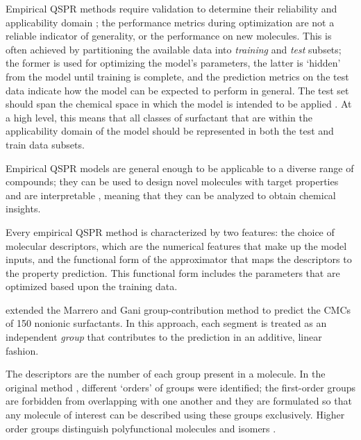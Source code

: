 Empirical QSPR methods require validation to determine their reliability and
applicability domain
\cite{veerasamyValidationQSARModelsstrategies2011,tropshaBestPracticesQSAR2010,leonardSelectionTrainingTest2006};
the performance metrics during optimization are not a reliable indicator of
generality, or the performance on new molecules. This is often achieved by
partitioning the available data into \emph{training} and \emph{test} subsets;
the former is used for optimizing the model's parameters, the latter is `hidden'
from the model until training is complete, and the prediction metrics on the
test data indicate how the model can be expected to perform in general. The test
set should span the chemical space in which the model is intended to be applied
\cite{leonardSelectionTrainingTest2006}. At a high level, this means that all
classes of surfactant that are within the applicability domain of the model
should be represented in both the test and train data subsets.

Empirical QSPR models are general enough to be applicable to a diverse range of
compounds; they can be used to design novel molecules with target properties
\cite{gantzerInverseQSPRNovoDesign2020,bolboacaMolecularDesignQSARs2013} and are
interpretable \cite{zefirovFragmentalApproachQSPR2002}, meaning that they can be
analyzed to obtain chemical insights.

Every empirical QSPR method is characterized by two features: the choice of
molecular descriptors, which are the numerical features that make up the model
inputs, and the functional form of the approximator that maps the descriptors to
the property prediction. This functional form includes the parameters that are
optimized based upon the training data.

\citet{matteiModelingCriticalMicelle2013} extended the Marrero and Gani
group-contribution method \cite{ganiAutomaticCreationMissing2005} to predict the
CMCs of 150 nonionic surfactants. In this approach, each segment is treated as
an independent \emph{group} that contributes to the prediction in an additive,
linear fashion.

The descriptors are the number of each group present in a molecule. In the
original method \cite{ganiAutomaticCreationMissing2005}, different `orders' of
groups were identified; the first-order groups are forbidden from overlapping
with one another and they are formulated so that any molecule of interest can be
described using these groups exclusively. Higher order groups distinguish
polyfunctional molecules and isomers \cite{ganiAutomaticCreationMissing2005}.

